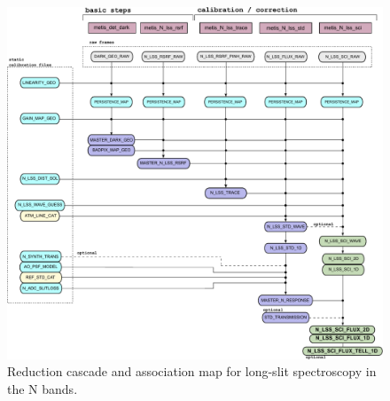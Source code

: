
\begin{landscape}
\begin{figure}[ht]
  \centering
  \includegraphics{figures/N_LSS_pipeline_wf_draft_latest_part_1_v0.83.pdf}
  \caption[Reduction cascade and association map for N long-slit
  spectroscopy]{Reduction cascade and association map for long-slit
    spectroscopy in the N bands. }
  \label{Fig:NLssAssomap1}
    \end{figure}
\end{landscape}

